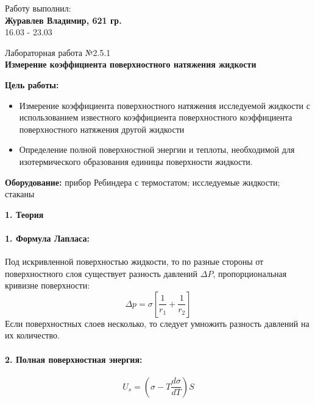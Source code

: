 \documentclass[12pt,a4paper]{article}
\author{Владимир Журавлев}
\begin{document}
\begin{flushright}
Работу выполнил:\\
\textbf{Журавлев Владимир, 621 гр.\\}
16.03 - 23.03

\end{flushright}
\begin{center}
\begin{LARGE}

\vspace{\baselineskip}
Лабораторная работа №2.5.1\\
\textbf{Измерение коэффициента поверхностного натяжения жидкости}\\
\vspace{\baselineskip}

\end{LARGE}
\end{center}

\noindent\textbf{Цель работы:} 
\begin{itemize}
\item Измерение коэффициента поверхностного натяжения исследуемой жидкости с использованием известного коэффициента поверхностного коэффициента поверхностного натяжения другой жидкости
\item Определение полной поверхностной энергии и теплоты, необходимой для изотермического образования единицы поверхности жидкости.
\end{itemize}
\textbf{Оборудование:} прибор Ребиндера с термостатом; исследуемые жидкости; стаканы\\
\begin{Large}
\begin{center}
\textbf{1. Теория}\\
\end{center}
\end{Large}
\paragraph{1. Формула Лапласа:} Под искривленной поверхностью жидкости, то по разные стороны от поверхностного слоя существует разность давлений $\Delta P$, пропорциональная кривизне поверхности:
\begin{equation}
\Delta p = \sigma  \left[   \frac{1}{r_{1}}+\frac{1}{r_{2}} \right]
\end{equation}
Если поверхностных слоев несколько, то следует умножить разность давлений на их количество.
\paragraph{2. Полная поверхностная энергия:}
\begin{equation}
U_{s} = \left( \sigma - T\frac{d \sigma}{dT} \right) S
\end{equation}
\end{document}
